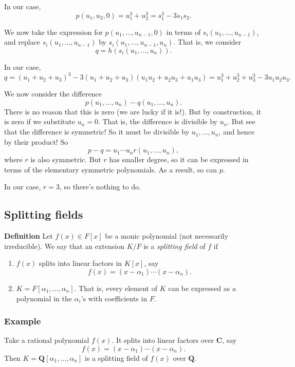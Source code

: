 \documentclass[11pt]{article}
\begin{document}
In our case,
\[p(u_{1},u_{2}, 0) = u_{1}^{3}+u_{2}^3 = s_{1}^{3}-3s_{1}s_{2}.\]

We now take the expression for \(p(u_{1}, \dots, u_{n-1}, 0)\) in terms of \(s_{i}(u_{1}, \dots, u_{n-1})\), and replace \(s_{i}(u_{1}, \dots, u_{n-1})\) by \(s_{i}(u_{1}, \dots, u_{n-1}, u_{n})\).
That is, we consider
\[ q = h(s_{i}(u_{1}, \dots, u_{n})).\]

In our case,
\[ q = (u_{1}+u_{2}+u_{3})^3 - 3(u_{1}+u_{2}+u_{3})(u_{1}u_{2} +u_{2}u_{3} + u_{1}u_{3}) = u_{1}^{3}+u_{2}^{3}+u_{3}^{3} - 3u_{1}u_{2}u_{3}. \]

We now consider the difference
\[ p(u_{1}, \dots, u_{n}) - q(u_{1}, \dots, u_{n}).\]
There is no reason that this is zero (we are lucky if it is!).
But by construction, it is zero if we substitute \(u_{n} = 0\).
That is, the difference is divisible by \(u_{n}\).
But see that the difference is symmetric!
So it must be divisible by \(u_{1}, \dots, u_{n}\), and hence by their product!
So
\[ p-q = u_{1}\cdots u_{n} r(u_{1}, \dots, u_{n}),\]
where \(r\) is also symmetric.
But \(r\) has smaller degree, so it can be expressed in terms of the elementary symmetric polynomials.
As a result, so can \(p\).

In our case, \(r = 3\), so there's nothing to do.
\subsection{Splitting fields}
\label{sec:org3a6fcda}
\textbf{Definition} Let \(f(x) \in F[x]\) be a monic polynomial (not necessarily irreducible).
We say that an extension \(K/F\) is a \emph{splitting field} of \(f\) if
\begin{enumerate}
\item \(f(x)\) splits into linear factors in \(K[x]\), say
\[ f(x) = (x-\alpha_{1}) \cdots (x-\alpha_{n}).\]
\item \(K = F[\alpha_1,\dots, \alpha_n].\)
That is, every element of \(K\) can be expressed as a polynomial in the \(\alpha_{i}\)'s with coefficients in \(F\).
\end{enumerate}
\subsubsection{Example}
\label{sec:org4ea6a92}
Take a rational polynomial \(f(x)\).  It splits into linear factors over \(\mathbf{C}\), say
\[ f(x) = (x-\alpha_{1}) \cdots (x-\alpha_{n}).\]
Then \(K = \mathbf{Q}[\alpha_1,\dots,\alpha_n]\) is a splitting field of \(f(x)\) over \(\mathbf{Q}\).
\end{document}
